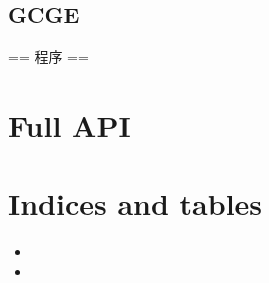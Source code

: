\documentclass[letterpaper,10pt,english]{sphinxmanual}
\begin{document}
\section{GCGE}
\label{\detokenize{src/gcge/main:id1}}
\sphinxstepscope

\sphinxAtStartPar
==
程序
==


\chapter{Full API}
\label{\detokenize{api/library_root:full-api}}\label{\detokenize{api/library_root::doc}}

\chapter{Indices and tables}
\label{\detokenize{index:indices-and-tables}}\begin{itemize}
\item {} 
\sphinxAtStartPar
{}

\item {} 
\sphinxAtStartPar
{}

\end{itemize}



\renewcommand{\indexname}{Index}
\printindex
\end{document}
